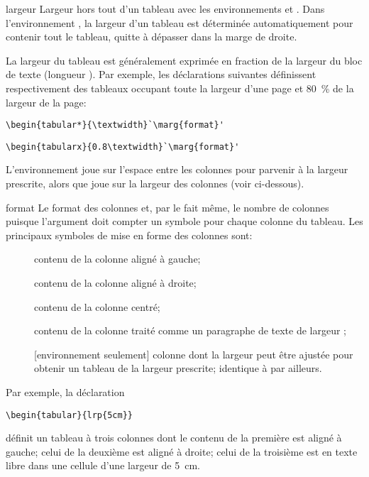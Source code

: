 \begin{list}{}{%
    \setlength{\labelsep}{1.5ex}
    \setlength{\leftmargin}{\labelwidth}
    \addtolength{\leftmargin}{\labelsep}
    \setlength{\parsep}{0.5ex plus0.2ex minus0.2ex}
    \setlength{\itemsep}{0.3ex}
    \renewcommand{\makelabel}[1]{\meta{#1}\hfill}}
%
\item[largeur] Largeur hors tout d'un tableau avec les environnements
   et . Dans l'environnement ,
  la largeur d'un tableau est déterminée automatiquement pour contenir
  tout le tableau, quitte à dépasser dans la marge de droite.

  La largeur du tableau est généralement exprimée en fraction de la
  largeur du bloc de texte (longueur \cmd{\textwidth}). Par exemple,
  les déclarations suivantes définissent respectivement des tableaux
  occupant toute la largeur d'une page et 80~\% de la largeur de la
  page:
\begin{lstlisting}
\begin{tabular*}{\textwidth}`\marg{format}'
\end{lstlisting}
\begin{lstlisting}
\begin{tabularx}{0.8\textwidth}`\marg{format}'
\end{lstlisting}
  L'environnement  joue sur l'espace entre les colonnes
  pour parvenir à la largeur prescrite, alors que  joue
  sur la largeur des colonnes (voir ci-dessous).
\item[format] Le format des colonnes et, par le fait même, le nombre
  de colonnes puisque l'argument doit compter un symbole pour chaque
  colonne du tableau. Les principaux symboles de mise en forme des
  colonnes sont:
  \begin{description}
  \item[\normalfont{}] contenu de la colonne aligné à gauche;
  \item[\normalfont{}] contenu de la colonne aligné à droite;
  \item[\normalfont{}] contenu de la colonne centré;
  \item[\normalfont{}] contenu de la
    colonne traité comme un paragraphe de texte de largeur
    ;
  \item[\normalfont{}] [environnement  seulement]
    colonne dont la largeur peut être ajustée pour obtenir un tableau
    de la largeur prescrite; identique à  par ailleurs.
  \end{description}
  Par exemple, la déclaration
\begin{lstlisting}
\begin{tabular}{lrp{5cm}}
\end{lstlisting}
  définit un tableau à trois colonnes dont le contenu de la première
  est aligné à gauche; celui de la deuxième est aligné à droite; celui de
  la troisième est en texte libre dans une cellule d'une largeur de 5~cm.


\end{list}

